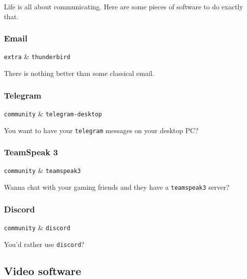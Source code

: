 \documentclass[10pt]{dustdoc}
\begin{document}
Life is all about communicating.
Here are some pieces of software to do exactly that.

\subsubsection{Email}
\label{sec:email}

\begin{packagetable}
    \texttt{extra} & \texttt{thunderbird} \\
\end{packagetable}

There is nothing better than some classical email.

\subsubsection{Telegram}
\label{sec:telegram}

\begin{packagetable}
    \texttt{community} & \texttt{telegram-desktop} \\
\end{packagetable}

You want to have your \texttt{telegram} messages on your desktop PC?

\subsubsection{TeamSpeak 3}
\label{sec:teamspeak-3}

\begin{packagetable}
    \texttt{community} & \texttt{teamspeak3} \\
\end{packagetable}

Wanna chat with your gaming friends and they have a \texttt{teamspeak3} server?

\subsubsection{Discord}
\label{sec:discord}

\begin{packagetable}
    \texttt{community} & \texttt{discord} \\
\end{packagetable}

You’d rather use \texttt{discord}?

\subsection{Video software}
\label{sec:gui-video-software}
\end{document}
